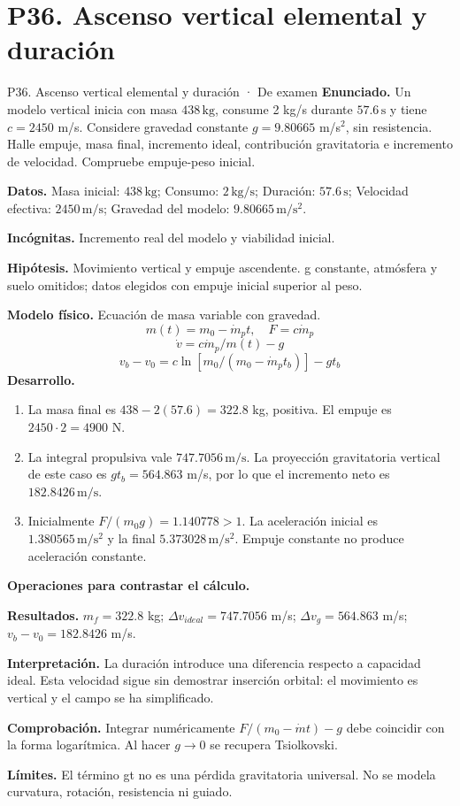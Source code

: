 \section{P36. Ascenso vertical elemental y duración}
\begin{studiumworked}{P36. Ascenso vertical elemental y duración · De examen}
\textbf{Enunciado.} Un modelo vertical inicia con masa $438\,\mathrm{kg}$, consume 2 kg/s durante $57.6\,\mathrm{s}$ y tiene $c=2450$ m/s. Considere gravedad constante $g=9.80665$ m/s$^2$, sin resistencia. Halle empuje, masa final, incremento ideal, contribución gravitatoria e incremento de velocidad. Compruebe empuje-peso inicial.

\textbf{Datos.} Masa inicial: $438\,\mathrm{kg}$; Consumo: $2\,\mathrm{kg/s}$; Duración: $57.6\,\mathrm{s}$; Velocidad efectiva: $2450\,\mathrm{m/s}$; Gravedad del modelo: $9.80665\,\mathrm{m/s^2}$.

\textbf{Incógnitas.} Incremento real del modelo y viabilidad inicial.

\textbf{Hipótesis.} Movimiento vertical y empuje ascendente. g constante, atmósfera y suelo omitidos; datos elegidos con empuje inicial superior al peso.

\textbf{Modelo físico.} Ecuación de masa variable con gravedad.
\[m(t)=m_0-\dot m_pt,\quad F=c\dot m_p\]
\[\dot v=c\dot m_p/m(t)-g\]
\[v_b-v_0=c\ln[m_0/(m_0-\dot m_pt_b)]-gt_b\]
\textbf{Desarrollo.}
\begin{enumerate}
\item La masa final es $438-2(57.6)=322.8$ kg, positiva. El empuje es $2450\cdot2=4900$ N.
\item La integral propulsiva vale $747.7056\,\mathrm{m/s}$. La proyección gravitatoria vertical de este caso es $g t_b=564.863$ m/s, por lo que el incremento neto es $182.8426\,\mathrm{m/s}$.
\item Inicialmente $F/(m_0g)=1.140778>1$. La aceleración inicial es $1.380565\,\mathrm{m/s^2}$ y la final $5.373028\,\mathrm{m/s^2}$. Empuje constante no produce aceleración constante.
\end{enumerate}
\textbf{Operaciones para contrastar el cálculo.}

\textbf{Resultados.} $m_f=322.8$ kg; $\Delta v_{ideal}=747.7056$ m/s; $\Delta v_g=564.863$ m/s; $v_b-v_0=182.8426$ m/s.

\textbf{Interpretación.} La duración introduce una diferencia respecto a capacidad ideal. Esta velocidad sigue sin demostrar inserción orbital: el movimiento es vertical y el campo se ha simplificado.

\textbf{Comprobación.} Integrar numéricamente $F/(m_0-\dot m t)-g$ debe coincidir con la forma logarítmica. Al hacer $g\to0$ se recupera Tsiolkovski.

\textbf{Límites.} El término gt no es una pérdida gravitatoria universal. No se modela curvatura, rotación, resistencia ni guiado.
\end{studiumworked}

